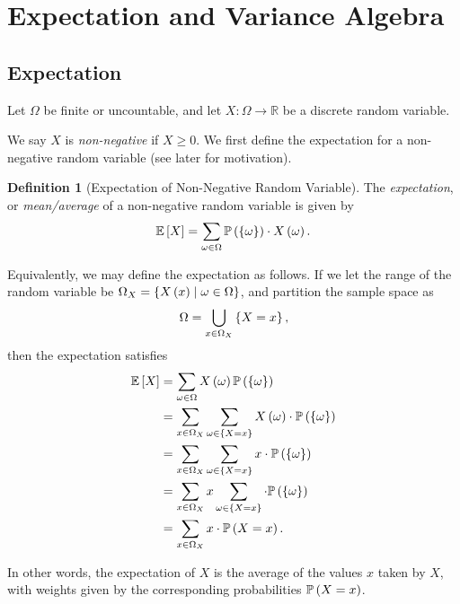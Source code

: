 \documentclass{article}
\theoremstyle{definition}
\newtheorem{definition}[theorem]{Definition}
\theoremstyle{remark}
\newcommand{\RR}{\mathbb{R}}
\newcommand{\Prob}{\mathbb{P}}
\newcommand{\Expt}{\mathbb{E}}
\newcommand{\set}[2]{\{#1\mid #2\}}
\newcommand{\functiondomain}[3]{#1:#2\to #3}
\begin{document}
\section{Expectation and Variance Algebra}

\subsection{Expectation}

Let \(\Omega\) be finite or uncountable, and let \(\functiondomain{X}{\Omega}{\RR}\) be a discrete random variable.

We say \(X\) is \emph{non-negative} if \(X \geq 0\). We first define the expectation for a non-negative random variable (see later for motivation).

\begin{definition}[Expectation of Non-Negative Random Variable]
    \label{def:expectation-non-negative}%
    The \emph{expectation}, or \emph{mean/average} of a non-negative random variable is given by
    \[
        \Expt \bqty{X} = \sum_{\omega \in \Omega} \Prob\pqty{\Bqty{\omega}} \cdot X\pqty{\omega}.
    \]
\end{definition}

Equivalently, we may define the expectation as follows. If we let the range of the random variable be \(\Omega_X = \set{X\pqty{x}}{\omega \in \Omega}\), and partition the sample space as
\[
    \Omega = \bigcup_{x \in \Omega_X} \left\{X = x\right\},
\]
then the expectation satisfies
\begin{align*}
    \Expt\bqty{X} &= \sum_{\omega \in \Omega} X\pqty{\omega} \Prob\pqty{\Bqty{\omega}} \\
    &= \sum_{x \in \Omega_X} \sum_{\omega \in \Bqty{X = x}} X\pqty{\omega} \cdot \Prob\pqty{\Bqty{\omega}} \\
    &= \sum_{x \in \Omega_X} \sum_{\omega \in \Bqty{X = x}} x \cdot \Prob\pqty{\Bqty{\omega}} \\
    &= \sum_{x \in \Omega_X} x \sum_{\omega \in \Bqty{X = x}} \cdot \Prob\pqty{\Bqty{\omega}} \\
    &= \sum_{x \in \Omega_X} x \cdot \Prob\pqty{X = x}.
\end{align*}

In other words, the expectation of \(X\) is the average of the values \(x\) taken by \(X\), with weights given by the corresponding probabilities \(\Prob\pqty{X = x}\).
\end{document}
